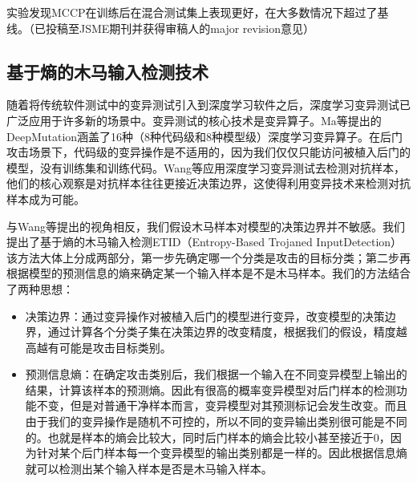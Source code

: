 \documentclass[fontset=macnew,UTF8]{article} %
\begin{document}
\begin{framed}
	\noindent 实验发现MCCP在训练后在混合测试集上表现更好，在大多数情况下超过了基线。（已投稿至JSME期刊并获得审稿人的major revision意见）
\end{framed}




\subsection{基于熵的木马输入检测技术}

随着将传统软件测试中的变异测试\cite{jia2010analysis}引入到深度学习软件\cite{shen2018munn,ma2018deepmutation}之后，深度学习变异测试已广泛应用于许多新的场景中。变异测试的核心技术是变异算子。Ma等\cite{ma2018deepmutation}提出的DeepMutation涵盖了16种（8种代码级和8种模型级）深度学习变异算子。在后门攻击场景下，代码级的变异操作是不适用的，因为我们仅仅只能访问被植入后门的模型，没有训练集和训练代码。Wang等\cite{wang2019adversarial}应用深度学习变异测试去检测对抗样本，他们的核心观察是对抗样本往往更接近决策边界，这使得利用变异技术来检测对抗样本成为可能。

与Wang\cite{wang2019adversarial}等提出的视角相反，我们假设木马样本对模型的决策边界并不敏感。我们提出了基于熵的木马输入检测ETID（Entropy-Based Trojaned InputDetection）该方法大体上分成两部分，第一步先确定哪一个分类是攻击的目标分类；第二步再根据模型的预测信息的熵来确定某一个输入样本是不是木马样本。我们的方法结合了两种思想：

\begin{itemize}
	\item 决策边界\cite{shen2020mcp}：通过变异操作对被植入后门的模型进行变异，改变模型的决策边界，通过计算各个分类子集在决策边界的改变精度，根据我们的假设，精度越高越有可能是攻击目标类别。
	\item 预测信息熵\cite{gao2019strip}：在确定攻击类别后，我们根据一个输入在不同变异模型上输出的结果，计算该样本的预测熵。因此有很高的概率变异模型对后门样本的检测功能不变，但是对普通干净样本而言，变异模型对其预测标记会发生改变。而且由于我们的变异操作是随机不可控的，所以不同的变异输出类别很可能是不同的。也就是样本的熵会比较大，同时后门样本的熵会比较小甚至接近于0，因为针对某个后门样本每一个变异模型的输出类别都是一样的。因此根据信息熵就可以检测出某个输入样本是否是木马输入样本。
\end{itemize}
\end{document}
